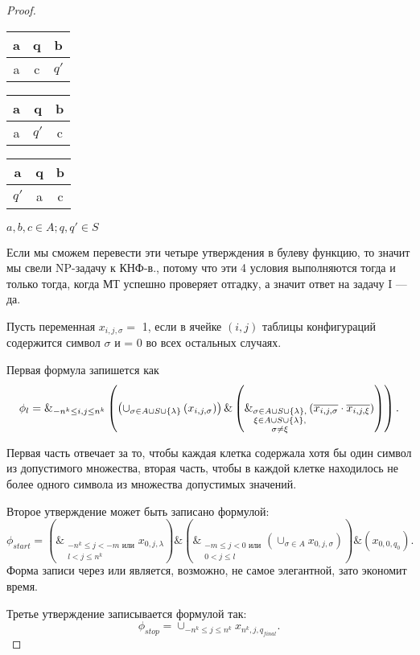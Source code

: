 \begin{proof}
\begin{enumerate}
\begin{table}[h!]
\centering
\begin{tabular}{|c|c|c|}
\hline a&q&b\\
\hline a&c&$q'$\\
\hline
\end{tabular}
\end{table}
\begin{table}[h!]
\centering
\begin{tabular}{|c|c|c|}
\hline a&q&b\\
\hline a&$q'$&c\\
\hline
\end{tabular}
\end{table}
\begin{table}[h!]
\centering
\begin{tabular}{|c|c|c|}
\hline a&q&b\\
\hline $q'$&a&c\\
\hline
\end{tabular}
\end{table}

$a, b, c \in A; q, q' \in S$

\end{enumerate}
Если мы сможем перевести эти четыре утверждения в булеву функцию, то значит мы
свели NP-задачу к КНФ-в., потому что эти 4 условия выполняются тогда и только
тогда, когда МТ успешно проверяет отгадку, а значит ответ на задачу I --- да.

Пусть переменная $x_{i,j,\sigma} =$ 1, если в ячейке  $(i,j)$ таблицы
конфигураций содержится символ  $\sigma$ и = 0 во всех остальных случаях.

Первая формула запишется как \[
	\phi_l = \&_{-n^k\le i, j\le n^k} \left( \left( \cup_{\sigma \in A\cup S \cup
	\{\lambda \} } \left( x_{i,j,\sigma}  \right)  \right)\&
	\\
	\left(
	\&_{\substack{\sigma\in A\cup S \cup
	\{\lambda \}
	, \\
\xi\in A\cup S \cup \{\lambda \},\\
\sigma \neq \xi
	}} \left( \overline{x_{i,j,\sigma}} \cdot \overline{x_{i,j,\xi}} \right)
\right) \right)
.\] 

Первая часть отвечает за то, чтобы каждая клетка содержала хотя бы один символ
из допустимого множества, вторая часть, чтобы в каждой клетке находилось не
более одного символа из множества допустимых значений.

Второе утверждение может быть записано формулой:
\[
	\phi_{start} = \left( \&_{\substack{-n^k\le j < -m \text{ или} \\ l<j\le n^k}} x_{0,j,\lambda} \right) \& 
	\left( \&_{\substack{-m\le  j < 0 \text{ или}\\ 0<j\le l}}
	\left(\cup_{\sigma \in A} x_{0,j,\sigma}\right) \right) \& 
	\left( x_{0,0,q_0} \right) 
.\] 
Форма записи через или является, возможно, не самое элегантной, зато экономит
время.

Третье утверждение записывается формулой так:
\[
	\phi_{stop} = \cup_{-n^k\le j\le n^k} x_{n^k, j, q_{final}}
.\] 
\end{proof}

